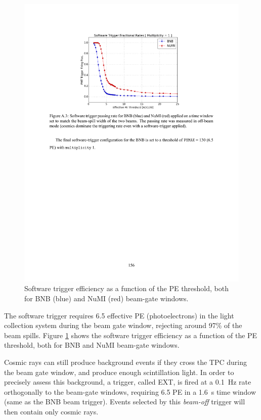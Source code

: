 \begin{figure}[htbp]
    \centering
    \includegraphics[width=0.85\linewidth]{figures/pmttrigger.pdf}
    \caption{Software trigger efficiency as a function of the PE threshold, both for BNB (blue) and NuMI (red) beam-gate windows.}
    \label{fig:pmttrigger}
\end{figure}

The software trigger requires 6.5 effective PE (photoelectrons) in the light collection system during the beam gate window, rejecting around 97\% of the beam spills. Figure \ref{fig:pmttrigger} shows the software trigger efficiency as a function of the PE threshold, both for BNB and NuMI beam-gate windows. 

Cosmic rays can still produce background events if they cross the TPC during the beam gate window, and produce enough scintillation light. In order to precisely assess this background, a trigger, called EXT, is fired at a 0.1~Hz rate orthogonally to the beam-gate windows, requiring 6.5 PE in a 1.6~\si{\micro}s time window (same as the BNB beam trigger). Events selected by this \emph{beam-off} trigger will then contain only cosmic rays.

